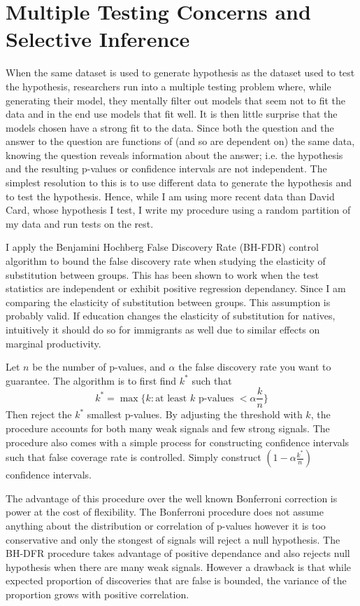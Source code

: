 \documentclass[11pt]{article}
\theoremstyle{definition}
\theoremstyle{remark}
\def\a{\alpha}
\begin{document}
\section{Multiple Testing Concerns and Selective Inference}

When the same dataset is used to generate hypothesis as the dataset used to
test the hypothesis, researchers run into a multiple testing problem where, while
generating their model, they  mentally filter out models that seem not to fit the
data and in the end use models that fit well. It is then little surprise that the
models chosen have a strong fit to the data. Since both the question and the
answer to the question are functions of (and so are dependent on) the same data,
knowing the question reveals information about the answer; i.e. the hypothesis
and the resulting p-values or confidence intervals are not independent. The
simplest resolution to this is to use different data to generate the hypothesis
and to test the hypothesis. Hence, while I am using more recent data than David
Card, whose hypothesis I test, I write my procedure using a random partition of
my data and run tests on the rest.

I apply the Benjamini Hochberg False Discovery Rate (BH-FDR) control
algorithm to bound the false discovery rate when studying the elasticity of
substitution between groups. This has been shown  to work when the
test statistics are independent or exhibit positive regression dependancy. Since
I am comparing the elasticity of substitution between groups. This assumption
is probably valid. If education changes the elasticity of substitution for
natives, intuitively it should do so for immigrants as well due to similar
effects on marginal productivity.

Let $n$ be the number of p-values, and $\a$ the false discovery rate
you want to guarantee. The algorithm is to first find $k^*$ such that
$$k^* = \max\{k :\text{at least }k\text{ p-values } < \a\frac kn\}$$
Then reject the $k^*$ smallest p-values. By adjusting the threshold
with $k$, the procedure accounts for both many weak signals and few strong
signals. The procedure also comes with a simple process for constructing confidence
intervals such that false coverage rate is controlled. Simply construct
$(1-\a\frac{k^*}n)$ confidence intervals.

The advantage of this procedure over the well known Bonferroni correction is
power at the cost of flexibility. The Bonferroni procedure does not assume anything
about the distribution or correlation of p-values however it is too conservative
and only the stongest of signals will reject a null hypothesis. The BH-DFR
procedure takes advantage of positive dependance and also rejects null hypothesis
when there are many weak signals. However a drawback is that while
expected proportion of discoveries that are false is bounded, the variance of
the proportion grows with positive correlation.
\end{document}
